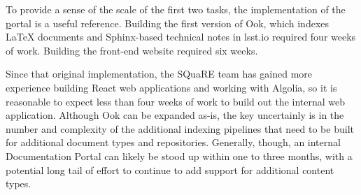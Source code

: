 To provide a sense of the scale of the first two tasks, the implementation of the \href{www.lsst.io} portal is a useful reference.
Building the first version of Ook, which indexes LaTeX documents and Sphinx-based technical notes in lsst.io required four weeks of work.
Building the front-end website required six weeks.

Since that original implementation, the SQuaRE team has gained more experience building React web applications and working with Algolia, so it is reasonable to expect less than four weeks of work to build out the internal web application.
Although Ook can be expanded as-is, the key uncertainly is in the number and complexity of the additional indexing pipelines that need to be built for additional document types and repositories.
Generally, though, an internal Documentation Portal can likely be stood up within one to three months, with a potential long tail of effort to continue to add support for additional content types.
